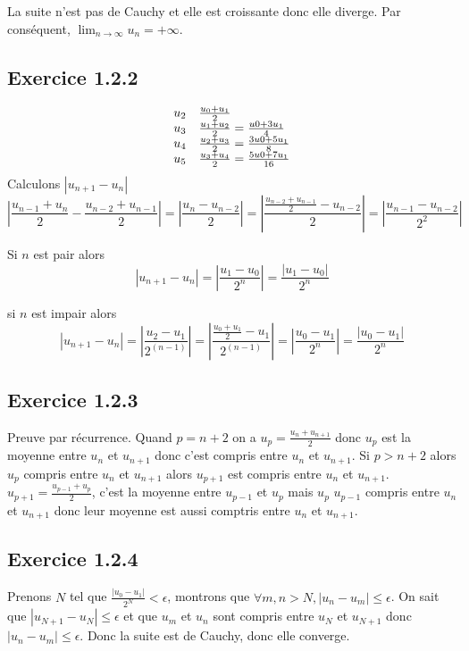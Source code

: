 \documentclass[]{book}
\theoremstyle{definition}
\begin{document}
La suite n'est pas de Cauchy et elle est croissante donc elle diverge. Par cons\'equent, $\lim_{n \to \infty} u_n = +\infty$.

\subsection*{Exercice 1.2.2}
$$
\begin{array}{l l}
u_2 & \frac{u_0+u_1}{2} \\
u_3 & \frac{u_1+u_2}{2} = \frac{u0+3u_1}{4}\\
u_4 & \frac{u_2+u_3}{2} = \frac{3u0+5u_1}{8}\\
u_5 & \frac{u_3+u_4}{2} = \frac{5u0+7u_1}{16}\\
\end{array}
$$
Calculons $|u_{n+1} - u_{n}|$
$$
|\frac{u_{n-1}+u_{n}}{2} - \frac{u_{n-2}+u_{n-1}}{2}| = |\frac{u_{n}-u_{n-2}}{2}| = |\frac{\frac{u_{n-2}+u_{n-1}}{2}-u_{n-2}}{2}| = |\frac{u_{n-1}-u_{n-2}}{2^2}|
$$ 

Si $n$ est pair alors 
$$|u_{n+1} - u_{n}| = |\frac{u_1 - u_0}{2^n}| = \frac{|u_1 - u_0|}{2^n}$$ 

si $n$ est impair alors
$$|u_{n+1} - u_{n}| = |\frac{u_2 - u_1}{2^(n-1)}| = |\frac{\frac{u_0+u_1}{2} - u_1}{2^(n-1)}| = |\frac{u_0 - u_1}{2^n}| = \frac{|u_0 - u_1|}{2^n}$$

\subsection*{Exercice 1.2.3}
Preuve par r\'ecurrence. Quand $p=n+2$ on a $u_p = \frac{u_n+u_{n+1}}{2}$ donc $u_p$ est la moyenne entre $u_n$ et $u_{n+1}$ donc c'est compris entre $u_n$ et $u_{n+1}$. Si $p>n+2$ alors $u_p$ compris entre $u_{n}$ et $u_{n+1}$ alors $u_{p+1}$ est compris entre $u_{n}$ et $u_{n+1}$. $u_{p+1} = \frac{u_{p-1} + u_{p}}{2}$, c'est la moyenne entre $u_{p-1}$ et $u_{p}$ mais $u_p$ $u_{p-1}$ compris entre $u_{n}$ et $u_{n+1}$ donc leur moyenne est aussi comptris entre $u_{n}$ et $u_{n+1}$.

\subsection*{Exercice 1.2.4}
Prenons $N$ tel que $\frac{|u_0-u_1|}{2^{N}} < \epsilon$, montrons que $\forall m,n > N, |u_n-u_m| \leq \epsilon$. On sait que $|u_{N+1}-u_N| \leq \epsilon$ et que $u_m$ et $u_n$ sont compris entre $u_{N}$ et $u_{N+1}$ donc $|u_n - u_m| \leq \epsilon$. Donc la suite est de Cauchy, donc elle converge.
\end{document}
